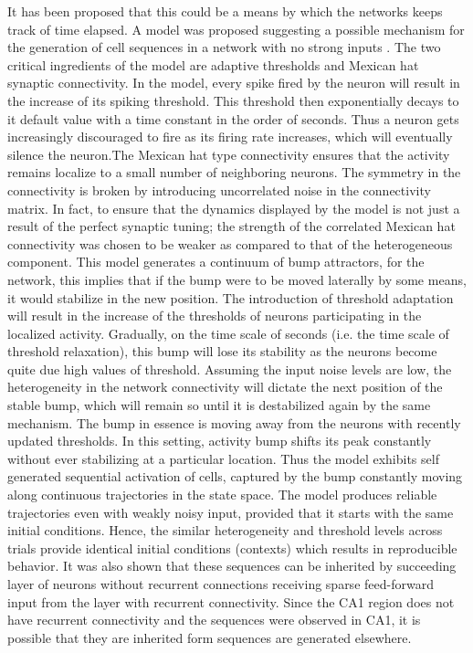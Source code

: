 It has been proposed that this could be a means by which the networks keeps track of time elapsed. A model was proposed suggesting a possible mechanism for the generation of cell sequences in a network with no strong inputs \cite{Itskov2011a}. The two critical ingredients of the model are adaptive thresholds and Mexican hat synaptic connectivity. In the model, every spike fired by the neuron will result in the increase of its spiking threshold. This threshold then exponentially decays to it default value with a time constant in the order of seconds. Thus a neuron gets increasingly discouraged to fire as its firing rate increases, which will eventually silence the neuron.The Mexican hat type connectivity ensures that the activity remains localize to a small number of neighboring neurons. The symmetry in the connectivity is broken by introducing uncorrelated noise in the connectivity matrix. In fact, to ensure that the dynamics displayed by the model is not just a result of the perfect synaptic tuning; the strength of the correlated Mexican hat connectivity was chosen to be weaker as compared to that of the heterogeneous component. This model generates a continuum of bump attractors, for the network, this implies that if the bump were to be moved laterally by some means, it would stabilize in the new position.  The introduction of threshold adaptation will result in the increase of the thresholds of neurons participating in the localized activity. Gradually, on the time scale of seconds (i.e. the time scale of threshold relaxation), this bump will lose its stability as the neurons become quite due high values of threshold. Assuming the input noise levels are low, the heterogeneity in the network connectivity will dictate the next position of the stable bump, which will remain so until it is destabilized again by the same mechanism. The bump in essence is moving away from the neurons with recently updated thresholds. In this setting, activity bump shifts its peak constantly without ever stabilizing at a particular location. Thus the model exhibits self generated sequential activation of cells, captured by the bump constantly moving along continuous trajectories in the state space. The model produces reliable trajectories even with weakly noisy input, provided that it starts with the same initial conditions. Hence, the similar heterogeneity and threshold levels across trials provide identical initial conditions (contexts) which results in reproducible behavior. It was also shown that these sequences can be inherited by succeeding layer of neurons without recurrent connections receiving sparse feed-forward input from the layer with recurrent connectivity. Since the CA1 region does not have recurrent connectivity and the sequences were observed in CA1, it is possible that they are inherited form sequences are generated elsewhere.


